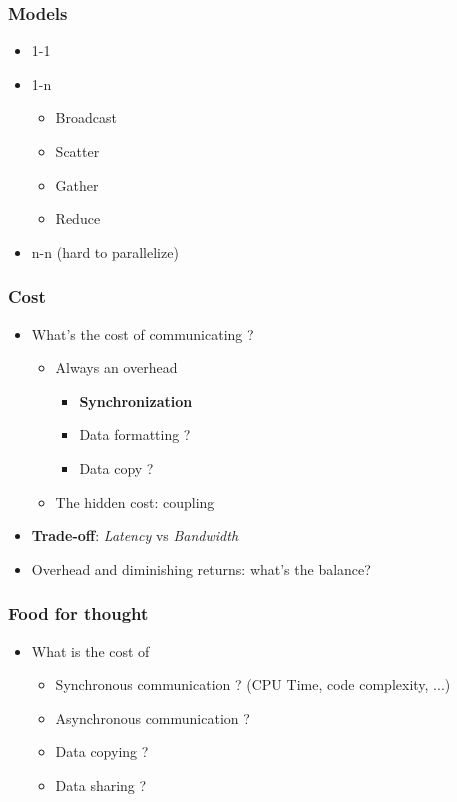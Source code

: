 \begin{frame}
  \frametitle{Models}
  \begin{itemize}
  \item 1-1
  \item 1-n
    \begin{itemize}
    \item Broadcast
    \item Scatter
    \item Gather
    \item Reduce
    \end{itemize}
  \item n-n (hard to parallelize)
  \end{itemize}
\end{frame}


\begin{frame}
  \frametitle{Cost}
  \begin{itemize}
  \item What's the cost of communicating ?
    \begin{itemize}
    \item Always an overhead
      \begin{itemize}
      \item \textbf{Synchronization}
      \item Data formatting ?
      \item Data copy ?
      \end{itemize}
    \item The hidden cost: coupling
    \end{itemize}
  \item \textbf{Trade-off}: \emph{Latency} vs \emph{Bandwidth}
  \item Overhead and diminishing returns: what's the balance?
  \end{itemize}
\end{frame}


\begin{frame}
  \frametitle{Food for thought}
  \begin{itemize}
  \item What is the cost of
    \begin{itemize}
    \item Synchronous communication ? (CPU Time, code complexity, ...)
    \item Asynchronous communication ?
    \item Data copying ?
    \item Data sharing ?
    \end{itemize}
  \end{itemize}
\end{frame}



